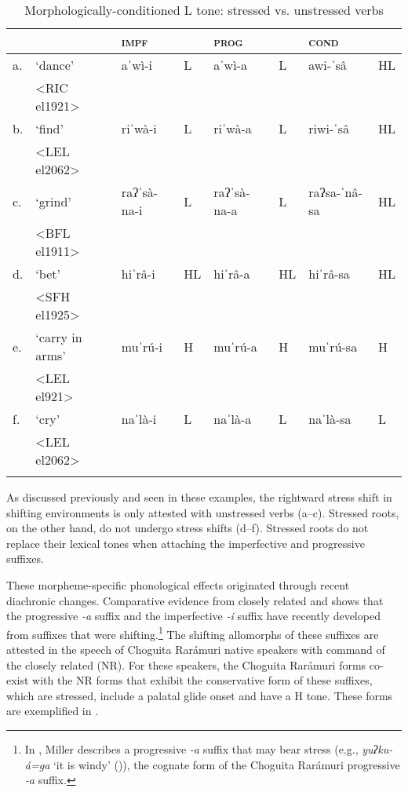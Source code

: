 \begin{table}
\caption{Morphologically-conditioned L tone: stressed vs. unstressed verbs}
\label{tab:morphologically-conditioned-L-tone}

\begin{tabularx}{\textwidth}{llllllll}
\lsptoprule
& & \textbf{\textsc{impf}}  & & \textbf{\textsc{prog}} &  & 	\textbf{\textsc{cond}} & \\
 \midrule
a.& ‘dance’ & aˈwì-i	& L &   	aˈwì-a	& L  & 	awi-ˈsâ   &  HL \\
&<RIC el1921>\\
b.& `find' & riˈwà-i & L &   riˈwà-a  & L &  	riwi-ˈsâ &  	HL	\\
&<LEL el2062>\\
c.& ‘grind’ &  raʔˈsà-na-i & L 	& raʔˈsà-na-a 	& L  & raʔsa-ˈnâ-sa  & HL\\
&<BFL el1911>\\
d.& `bet' &  hiˈrâ-i	& HL    &	hiˈrâ-a	 &  	HL 	& hiˈrâ-sa & HL\\
&<SFH el1925>\\
e.& `carry in arms' & muˈrú-i 	& H  &    	muˈrú-a     &	H  & 	muˈrú-sa  & H\\
&<LEL el921>\\
f.& `cry' &  naˈlà-i  & 	L  & naˈlà-a    &	L  & 	naˈlà-sa    & L \\
&<LEL el2062>\\
\lspbottomrule
\end{tabularx}
\end{table}

As discussed previously and seen in these examples, the rightward stress shift in shifting environments is only attested with unstressed verbs (a--c). Stressed roots, on the other hand, do not undergo stress shifts (d--f). Stressed roots do not replace their lexical tones when attaching the imperfective and progressive suffixes.

These morpheme-specific phonological effects originated through recent diachronic changes. Comparative evidence from closely related  \parencite{brambila1953gramatica}  and  \parencite{miller1996guarijio} shows that the progressive \textit{-a} suffix and the imperfective \textit{-i} suffix have recently developed from suffixes that were shifting.\footnote{In , Miller describes a progressive \textit{-a} suffix that may bear stress (e.g., \textit{yuʔku-á=ga} ‘it is windy’ (\citeyear[140]{miller1996guarijio})), the cognate form of the Choguita Rarámuri progressive \textit{-a} suffix.}  The shifting allomorphs of these suffixes are attested in the speech of Choguita Rarámuri native speakers with command of the closely related  (NR). For these speakers, the Choguita Rarámuri forms co-exist with the NR forms that exhibit the conservative form of these suffixes, which are stressed, include a palatal glide onset and have a H tone. These forms are exemplified in .

